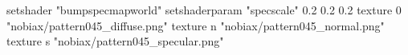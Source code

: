 setshader "bumpspecmapworld"
setshaderparam "specscale" 0.2 0.2 0.2
    texture 0 "nobiax/pattern045_diffuse.png"
    texture n "nobiax/pattern045_normal.png"
    texture s "nobiax/pattern045_specular.png"